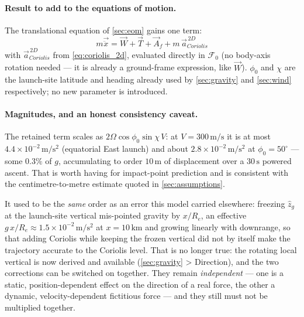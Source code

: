 {\paragraph{Result to add to the equations of motion.} The translational equation of \autoref{sec:eom} gains one term:
\begin{equation}
    m\vec{\ddot{x}} = \vec{W} + \vec{T} + \vec{A}_f + m\,\vec{a}_{Coriolis}^{\,2D}
\end{equation}
with $\vec{a}_{Coriolis}^{\,2D}$ from \autoref{eq:coriolis_2d}, evaluated directly in
$\mathcal{F}_0$ (no body-axis rotation needed --- it is already a ground-frame expression, like
$\vec{W}$). $\phi_0$ and $\chi$ are the launch-site latitude and heading already used by
\autoref{sec:gravity} and \autoref{sec:wind} respectively; no new parameter is introduced.

\paragraph{Magnitudes, and an honest consistency caveat.} The retained term scales as
$2\Omega\cos\phi_0\sin\chi\,V$: at $V = 300\,\mathrm{m/s}$ it is at most
$4.4\times10^{-2}\,\mathrm{m/s^2}$ (equatorial East launch) and about
$2.8\times10^{-2}\,\mathrm{m/s^2}$ at $\phi_0 = 50^\circ$ --- some $0.3\%$ of $g$, accumulating to
order $10\,\mathrm{m}$ of displacement over a $30\,\mathrm{s}$ powered ascent. That is worth
having for impact-point prediction and is consistent with the centimetre-to-metre estimate quoted
in \autoref{sec:assumptions}.

It used to be the \emph{same} order as an error this model carried elsewhere: freezing
$\hat{z}_g$ at the launch-site vertical mis-pointed gravity by $x/R_e$, an effective
$g\,x/R_e \approx 1.5\times10^{-2}\,\mathrm{m/s^2}$ at $x = 10\,\mathrm{km}$ and growing
linearly with downrange, so that adding Coriolis while keeping the frozen vertical did not by
itself make the trajectory accurate to the Coriolis level. That is no longer true: the rotating
local vertical is now derived and available (\autoref{sec:gravity} > Direction), and the two
corrections can be switched on together. They remain \emph{independent} --- one is a static,
position-dependent effect on the direction of a real force, the other a dynamic,
velocity-dependent fictitious force --- and they still must not be multiplied together.

}
